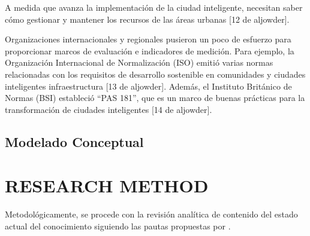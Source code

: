 \documentclass[a4paper,fleqn,spanish]{cas-dc}
\begin{document}


A medida que avanza la implementación de la ciudad inteligente, necesitan saber
cómo gestionar y mantener los recursos de las áreas urbanas [12 de aljowder].

Organizaciones internacionales y regionales
pusieron un poco de esfuerzo para proporcionar marcos de evaluación e
indicadores de medición.
Para ejemplo, la Organización Internacional de
Normalización (ISO) emitió varias normas relacionadas con los requisitos de
desarrollo sostenible en comunidades y ciudades inteligentes infraestructura
[13 de aljowder].
Además, el Instituto Británico de Normas (BSI) estableció “PAS 181”, que es un
marco de buenas prácticas para la transformación de ciudades inteligentes [14 de aljowder].
\cite{aljowder_systematic_2019}


\subsection{Modelado Conceptual}\label{afirmacion}


\section{RESEARCH METHOD}\label{metodo}

Metodológicamente, se procede con la revisión analítica de contenido del estado
actual del conocimiento \cite{kitchenham_guidelines_2007,
webster_analyzing_2002} siguiendo las pautas propuestas por \cite{Wolfswinkel2017}.
\end{document}
